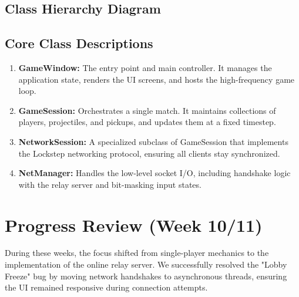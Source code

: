 \documentclass[a4paper,12pt]{article}
\begin{document}
\subsection{Class Hierarchy Diagram}
\begin{center}
\end{center}

\subsection{Core Class Descriptions}
\begin{enumerate}
    \item \textbf{GameWindow:} The entry point and main controller. It manages the application state, renders the UI screens, and hosts the high-frequency game loop.
    \item \textbf{GameSession:} Orchestrates a single match. It maintains collections of players, projectiles, and pickups, and updates them at a fixed timestep.
    \item \textbf{NetworkSession:} A specialized subclass of GameSession that implements the Lockstep networking protocol, ensuring all clients stay synchronized.
    \item \textbf{NetManager:} Handles the low-level socket I/O, including handshake logic with the relay server and bit-masking input states.
\end{enumerate}

\section{Progress Review (Week 10/11)}
During these weeks, the focus shifted from single-player mechanics to the implementation of the online relay server. We successfully resolved the "Lobby Freeze" bug by moving network handshakes to asynchronous threads, ensuring the UI remained responsive during connection attempts.
\end{document}
